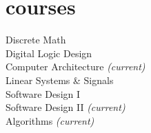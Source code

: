 \documentclass[12pt]{cv_class}
\begin{document}
\section{courses}%
Discrete Math\\
Digital Logic Design\\
Computer Architecture {\itshape(current)}\\
Linear Systems \& Signals\\
Software Design I\\
Software Design II {\itshape(current)}\\
Algorithms {\itshape(current)}\\
\end{document}
